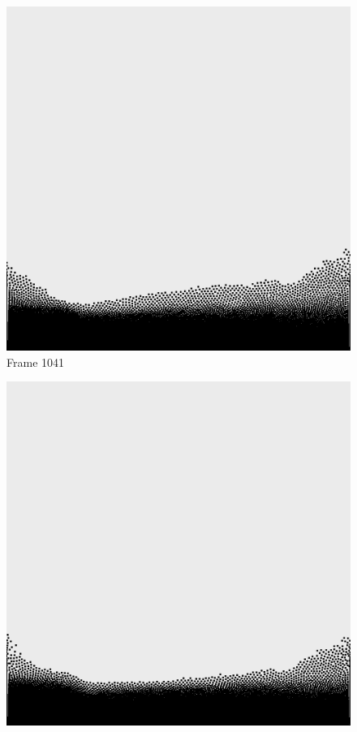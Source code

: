 \documentclass[a4paper, 12pt, oneside]{book}
\begin{document}
\begin{figure}[!ht]
    \addvspace{0.5ex}
        \begin{center}
            \includegraphics[width=\linewidth]{images/test_case_2/1041.png}
            Frame 1041
        \end{center}
    \endminipage
    \hfill
        \begin{center}
            \includegraphics[width=\linewidth]{images/test_case_2/1061.png}

\end{center}
\end{figure}
\end{document}
